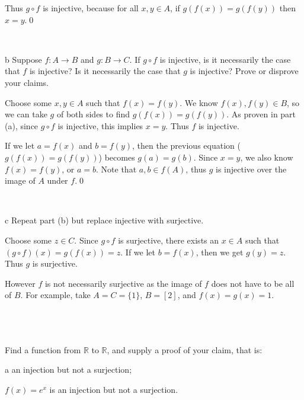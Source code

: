 \documentclass{article}
\begin{document}
Thus $g\circ f$ is injective, because for all $x,y\in A$, if $g( f( x)) =g( f( y))$ then $x=y$.\qed 

\

\begin{problem} b
Suppose $f:A\to B$ and $g:B\to C$. If $g\circ f$ is injective, is it necessarily the case that $f$ is injective? Is it necessarily the case that $g$ is injective? Prove or disprove your claims.
\end{problem}

Choose some $x,y\in A$ such that $f( x) =f( y)$. We know $f( x) ,f( y) \in B$, so we can take $g$ of both sides to find $g( f( x)) =g( f( y))$. As proven in part (a), since $g\circ f$ is injective, this implies $x=y$. Thus $f$ is injective. 

If we let $a=f( x)$ and $b=f( y)$, then the previous equation ($g( f( x)) =g( f( y))$) becomes $g( a) =g( b)$. Since $x=y$, we also know $f( x) =f( y)$, or $a=b$. Note that $a,b\in f( A)$, thus $g$ is injective over the image of $A$ under $f$.\qed

\

\begin{problem} c
Repeat part (b) but replace injective with surjective. 
\end{problem}

Choose some $z\in C$. Since $g\circ f$ is surjective, there exists an $x\in A$ such that $( g\circ f)( x) =g( f( x)) =z$. If we let $b=f( x)$, then we get $g( y) =z$. Thus $g$ is surjective.

However $f$ is not necessarily surjective as the image of $f$ does not have to be all of $B$. For example, take $A=C=\{1\}$, $B=[ 2]$, and $f( x) =g( x) =1$.

\
\hline
\section{}

\begin{problem*}
Find a function from $\mathbb{R}$ to $\mathbb{R}$, and supply a proof of your claim, that is:
\end{problem*}

\begin{problem} a
an injection but not a surjection;
\end{problem}

$f( x) =e^{x}$ is an injection but not a surjection. 
\end{document}
